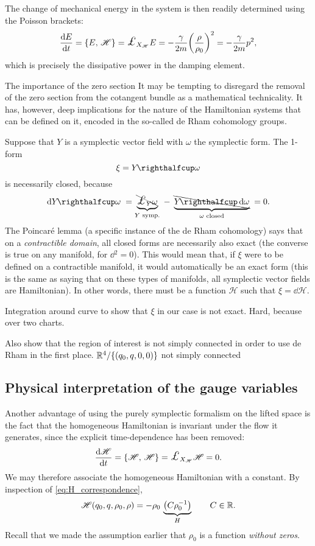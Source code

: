 The change of mechanical energy in the system is then readily determined using the Poisson brackets:
$$ \dv{E}{t} = \poisson{E}{\mathscr{H}} = \lied{X_\mathscr{H}}{E} = -\frac{\gamma}{2m}\qty(\frac{\rho}{\rho_0})^2 = -\frac{\gamma}{2m}p^2,$$
which is precisely the dissipative power in the damping element.


\begin{mathbox}{The importance of the zero section}
    It may be tempting to disregard the removal of the zero section from the cotangent bundle as a mathematical technicality. It has, however, deep implications for the nature of the Hamiltonian systems that can be defined on it, encoded in the so-called de Rham cohomology groups.
    
    Suppose that $Y$ is a symplectic vector field with $\omega$ the symplectic form. The 1-form
    $$\xi = \intpr{Y}{\omega}$$
    is necessarily closed, because
    $$ \dd{\intpr{Y}{\omega}} \; = \underbrace{\bcancel{\lied{Y}{\omega}}}_{Y \text{ symp.}}\;- \; \underbrace{\bcancel{\intpr{Y}{\dd{\omega}}}}_{\omega \text{ closed}}\; = 0. $$
    The Poincaré lemma (a specific instance of the de Rham cohomology) says that on a \emph{contractible domain}, all closed forms are necessarily also exact (the converse is true on any manifold, for $\dd{}^2 = 0$). This would mean that, if $\xi$ were to be defined on a contractible manifold, it would automatically be an exact form (this is the same as saying that on these types of manifolds, all symplectic vector fields are Hamiltonian). In other words, there must be a function $\mathscr{H}$ such that $\xi = \dd{\mathscr{H}}$.

    Integration around curve to show that $\xi$ in our case is not exact. Hard, because over two charts.

    Also show that the region of interest is not simply connected in order to use de Rham in the first place.
    $ \mathbb{R}^4 / \{(q_0, q, 0, 0)\} $ not simply connected
\end{mathbox}

\subsection{Physical interpretation of the gauge variables}
Another advantage of using the purely symplectic formalism on the lifted space is the fact that the homogeneous Hamiltonian is invariant under the flow it generates, since the explicit time-dependence has been removed:
$$ \dv{\mathscr{H}}{t} = \poisson{\mathscr{H}}{\mathscr{H}} = \lied{X_{\mathscr{H}}}{\mathscr{H}} = 0. $$
We may therefore associate the homogeneous Hamiltonian with a constant. By inspection of \cref{eq:H_correspondence}, 
$$ \mathscr{H}(q_0, q, \rho_0, \rho) = -\rho_0\,\underbrace{\qty(C\rho_0^{-1})}_{H} \qquad C \in \mathbb{R}.$$
Recall that we made the assumption earlier that $\rho_0$ is a function \emph{without zeros}. 

